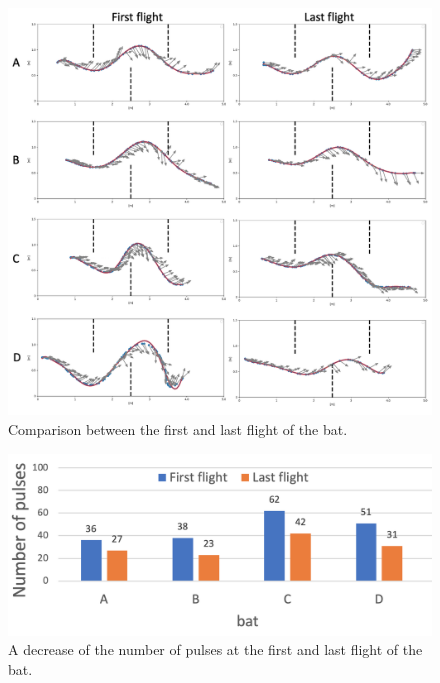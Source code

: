 \documentclass[../main]{subfiles}
\begin{document}
\newpage
{}
\begin{figure}[H]
  \centering
  \vfill
  \includegraphics[width=14cm]{figures/bat_trajectories.png}
  \caption{
    Comparison between the first and last flight of the bat.
  }\label{fig:bat_trajectories}
\end{figure}


\newpage
{}
\begin{figure}[H]
  \centering
  \vfill
  \includegraphics[width=13cm]{figures/bat_pulses.png}
  \caption{
    A decrease of the number of pulses at the first and last 
    flight of the bat.
  }\label{fig:bat_pulse}
\end{figure}
\end{document}
